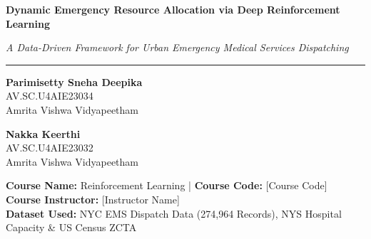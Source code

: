 \documentclass[11pt,a4paper]{article}
\begin{document}
\thispagestyle{empty}

\begin{titlepage}
    \thispagestyle{empty}
    \centering
    \vspace*{0.8cm}
    
    {\Huge \bfseries Dynamic Emergency Resource Allocation via Deep Reinforcement Learning \par}
    \vspace{0.4cm}
    {\LARGE \itshape A Data-Driven Framework for Urban Emergency Medical Services Dispatching \par}
    
    \vspace{1.0cm}
    \rule{\linewidth}{1pt}
    \vspace{0.8cm}
    
    \begin{minipage}{0.48\textwidth}
        \begin{center} \large
            \textbf{Parimisetty Sneha Deepika}\\
            AV.SC.U4AIE23034\\
            Amrita Vishwa Vidyapeetham
        \end{center}
    \end{minipage}
    \hfill
    \begin{minipage}{0.48\textwidth}
        \begin{center} \large
            \textbf{Nakka Keerthi}\\
            AV.SC.U4AIE23032\\
            Amrita Vishwa Vidyapeetham
        \end{center}
    \end{minipage}
    
    \vspace{1.0cm}
    
    \begin{center}
        \large
        \textbf{Course Name:} Reinforcement Learning \quad | \quad \textbf{Course Code:} [Course Code] \\
        \textbf{Course Instructor:} [Instructor Name] \\
        \textbf{Dataset Used:} NYC EMS Dispatch Data (274,964 Records), NYS Hospital Capacity \& US Census ZCTA
    \end{center}
    

\end{titlepage}
\end{document}
